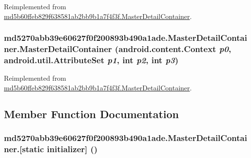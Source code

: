 Reimplemented from \hyperlink{classmd5b60ffeb829f638581ab2bb9b1a7f4f3f_1_1_master_detail_container_3e752c4a1c463a622ff8574921b3c763}{md5b60ffeb829f638581ab2bb9b1a7f4f3f.MasterDetailContainer}.\hypertarget{classmd5270abb39e60627f0f200893b490a1ade_1_1_master_detail_container_003d434348891f8f2e731962b72dd90a}{
\subsubsection[{MasterDetailContainer}]{\setlength{\rightskip}{0pt plus 5cm}md5270abb39e60627f0f200893b490a1ade.MasterDetailContainer.MasterDetailContainer (android.content.Context {\em p0}, \/  android.util.AttributeSet {\em p1}, \/  int {\em p2}, \/  int {\em p3})}}
\label{classmd5270abb39e60627f0f200893b490a1ade_1_1_master_detail_container_003d434348891f8f2e731962b72dd90a}




Reimplemented from \hyperlink{classmd5b60ffeb829f638581ab2bb9b1a7f4f3f_1_1_master_detail_container_02e06b2d64b99adfc10ba2adc27242c9}{md5b60ffeb829f638581ab2bb9b1a7f4f3f.MasterDetailContainer}.

\subsection{Member Function Documentation}
\hypertarget{classmd5270abb39e60627f0f200893b490a1ade_1_1_master_detail_container_cebd9434aa87b66b80bc49340b38a40d}{
\subsubsection[{[static initializer]}]{\setlength{\rightskip}{0pt plus 5cm}md5270abb39e60627f0f200893b490a1ade.MasterDetailContainer.\mbox{[}static initializer\mbox{]} ()}}
\label{classmd5270abb39e60627f0f200893b490a1ade_1_1_master_detail_container_cebd9434aa87b66b80bc49340b38a40d}




